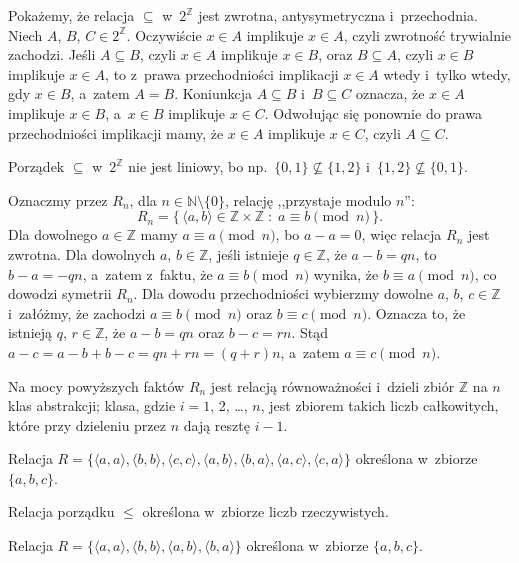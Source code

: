 
\exercise %
Pokażemy, że relacja $\subseteq$ w~$2^\mathbb{Z}$ jest zwrotna, antysymetryczna i~przechodnia.
Niech $A$, $B$, $C\in2^\mathbb{Z}$.
Oczywiście $x\in A$ implikuje $x\in A$, czyli zwrotność trywialnie zachodzi.
Jeśli $A\subseteq B$, czyli $x\in A$ implikuje $x\in B$, oraz $B\subseteq A$, czyli $x\in B$ implikuje $x\in A$, to z~prawa przechodniości implikacji $x\in A$ wtedy i~tylko wtedy, gdy $x\in B$, a~zatem $A=B$.
Koniunkcja $A\subseteq B$ i~$B\subseteq C$ oznacza, że $x\in A$ implikuje $x\in B$, a~$x\in B$ implikuje $x\in C$.
Odwołując się ponownie do prawa przechodniości implikacji mamy, że $x\in A$ implikuje $x\in C$, czyli $A\subseteq C$.

Porządek $\subseteq$ w~$2^\mathbb{Z}$ nie jest liniowy, bo np.\ $\{0,1\}\nsubseteq\{1,2\}$ i~$\{1,2\}\nsubseteq\{0,1\}$.

\exercise %
Oznaczmy przez $R_n$, dla $n\in\mathbb{N}\setminus\{0\}$, relację ,,przystaje modulo $n$'':
\[
	R_n = \{\,\langle a,b\rangle\in\mathbb{Z}\times\mathbb{Z}\;:\;a\equiv b\!\!\!\pmod{n}\,\}.
\]
Dla dowolnego $a\in\mathbb{Z}$ mamy $a\equiv a\pmod{n}$, bo $a-a=0$, więc relacja $R_n$ jest zwrotna.
Dla dowolnych $a$, $b\in\mathbb{Z}$, jeśli istnieje $q\in\mathbb{Z}$, że $a-b=qn$, to $b-a=-qn$, a~zatem z~faktu, że $a\equiv b\pmod{n}$ wynika, że $b\equiv a\pmod{n}$, co dowodzi symetrii $R_n$.
Dla dowodu przechodniości wybierzmy dowolne $a$, $b$, $c\in\mathbb{Z}$ i~załóżmy, że zachodzi $a\equiv b\pmod{n}$ oraz $b\equiv c\pmod{n}$.
Oznacza to, że istnieją $q$, $r\in\mathbb{Z}$, że $a-b=qn$ oraz $b-c=rn$.
Stąd $a-c=a-b+b-c=qn+rn=(q+r)n$, a~zatem $a\equiv c\pmod{n}$.

Na mocy powyższych faktów $R_n$ jest relacją równoważności i~dzieli zbiór $\mathbb{Z}$ na $n$ klas abstrakcji;  klasa, gdzie $i=1$, 2, \dots, $n$, jest zbiorem takich liczb całkowitych, które przy dzieleniu przez $n$ dają resztę $i-1$.

\exercise %
\subexercise
Relacja $R=\bigl\{\langle a,a\rangle,\langle b,b\rangle,\langle c,c\rangle,\langle a,b\rangle,\langle b,a\rangle,\langle a,c\rangle,\langle c,a\rangle\bigr\}$ określona w~zbiorze $\{a,b,c\}$.

\subexercise
Relacja porządku $\le$ określona w~zbiorze liczb rzeczywistych.

\subexercise
Relacja $R=\bigl\{\langle a,a\rangle,\langle b,b\rangle,\langle a,b\rangle,\langle b,a\rangle\bigr\}$ określona w~zbiorze $\{a,b,c\}$.


